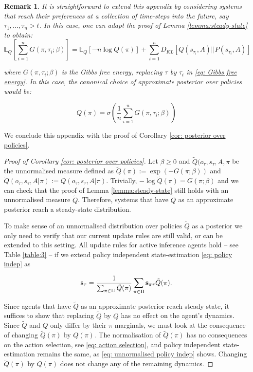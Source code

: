 \documentclass[review,12pt,authoryear]{elsarticle}
\newcommand{\E}{\mathbb E}
\newtheorem{remark}[theorem]{Remark}
\begin{document}
\begin{remark}
It is straightforward to extend this appendix by considering systems that reach their preferences at a collection of time-steps into the future, say $\tau_1,...,\tau_n >t$. In this case, one can adapt the proof of Lemma \ref{lemma:steady-state} to obtain:
\begin{equation*}
    \E_Q \left[\sum_{i =1}^n G(\pi, \tau_i; \beta)\right ]= \E_Q[-n \log Q(\pi)]+ \sum_{i =1}^n D_{KL}[Q(s_{\tau_i},A)||P(s_{\tau_i}, A)]
\end{equation*}

where $G(\pi, \tau_i; \beta)$ is the Gibbs free energy, replacing $\tau$ by $\tau_i$ in \eqref{eq: Gibbs free energy}. In this case, the canonical choice of approximate posterior over policies would be:

\begin{equation}
    Q(\pi)= \sigma \left(\frac 1 n \sum_{i =1}^n G(\pi, \tau_i; \beta)\right)
\end{equation}
\end{remark}

We conclude this appendix with the proof of Corollary \ref{cor: posterior over policies}.

\begin{proof}[Proof of Corollary \ref{cor: posterior over policies}]
Let $\beta \geq 0$ and $\tilde Q(o_\tau, s_\tau, A, \pi$ be the unnormalised measure defined as $\tilde Q(\pi) := \exp(-G(\pi; \beta))$ and $\tilde Q(o_\tau, s_\tau, A| \pi) := Q(o_\tau, s_\tau, A| \pi)$. Trivially, $-\log \tilde Q(\pi) = G(\pi; \beta)$ and we can check that the proof of Lemma \ref{lemma:steady-state} still holds with an unnormalised measure $\tilde Q$. Therefore, systems that have $\tilde Q$ as an approximate posterior reach a steady-state distribution.

To make sense of an unnormalised distribution over policies $\tilde Q$ as a posterior we only need to verify that our current update rules are still valid, or can be extended to this setting. All update rules for active inference agents hold -- see Table \ref{table:3} -- if we extend policy independent state-estimation \eqref{eq: policy indep} as

\begin{equation}
\label{eq: unnormalised policy indep}
    \bold s_\tau = \frac{1}{\sum_{\pi \in \Pi} \tilde Q(\pi)}\sum_{\pi \in \Pi} \bold s_{\pi\tau} \tilde Q(\pi).
\end{equation}

Since agents that have $\tilde Q$ as an approximate posterior reach steady-state, it suffices to show that replacing $\tilde Q$ by $Q$ has no effect on the agent's dynamics. Since $\tilde Q$ and $Q$ only differ by their $\pi$-marginals, we must look at the consequence of changing $\tilde Q(\pi)$ by $Q(\pi)$. The normalisation of $\tilde Q(\pi)$ has no consequences on the action selection, see \eqref{eq: action selection}, and policy independent state-estimation remains the same, as \eqref{eq: unnormalised policy indep} shows. Changing $\tilde Q(\pi)$ by $Q(\pi)$ does not change any of the remaining dynamics.
\end{proof}
\end{document}
